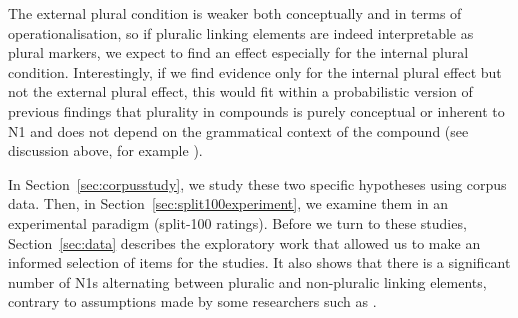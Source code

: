 The external plural condition is weaker both conceptually and in terms of operationalisation, so if pluralic linking elements are indeed interpretable as plural markers, we expect to find an effect especially for the internal plural condition.
Interestingly, if we find evidence only for the internal plural effect but not the external plural effect, this would fit within a probabilistic version of previous findings that plurality in compounds is purely conceptual or inherent to N1 and does not depend on the grammatical context of the compound (see discussion above, for example \citealt{Gallmann1998}).

In Section~\ref{sec:corpusstudy}, we study these two specific hypotheses using corpus data.
Then, in Section~\ref{sec:split100experiment}, we examine them in an experimental paradigm (split-100 ratings).
Before we turn to these studies, Section~\ref{sec:data} describes the exploratory work that allowed us to make an informed selection of items for the studies.
It also shows that there is a significant number of N1s alternating between pluralic and non-pluralic linking elements, contrary to assumptions made by some researchers such as \citet{NeefBorgwaldt2012,Neef2015}.
